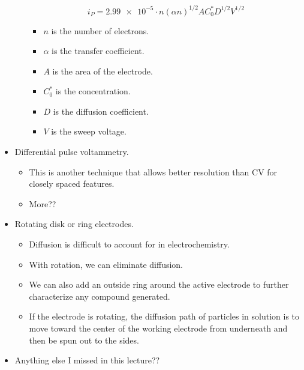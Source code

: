 \documentclass[../notes.tex]{subfiles}
\begin{document}
\begin{itemize}
\begin{itemize}
\begin{equation*}
            i_P = \num{2.99e-5}\cdot n(\alpha n)^{1/2}AC_0^*D^{1/2}V^{1/2}
        \end{equation*}
        \begin{itemize}
            \item $n$ is the number of electrons.
            \item $\alpha$ is the transfer coefficient.
            \item $A$ is the area of the electrode.
            \item $C_0^*$ is the concentration.
            \item $D$ is the diffusion coefficient.
            \item $V$ is the sweep voltage.
        \end{itemize}
    \end{itemize}
    \item Differential pulse voltammetry.
    \begin{itemize}
        \item This is another technique that allows better resolution than CV for closely spaced features.
        \item More??
    \end{itemize}
    \item Rotating disk or ring electrodes.
    \begin{itemize}
        \item Diffusion is difficult to account for in electrochemistry.
        \item With rotation, we can eliminate diffusion.
        \item We can also add an outside ring around the active electrode to further characterize any compound generated.
        \item If the electrode is rotating, the diffusion path of particles in solution is to move toward the center of the working electrode from underneath and then be spun out to the sides.
    \end{itemize}
    \item Anything else I missed in this lecture??
\end{itemize}
\end{document}

